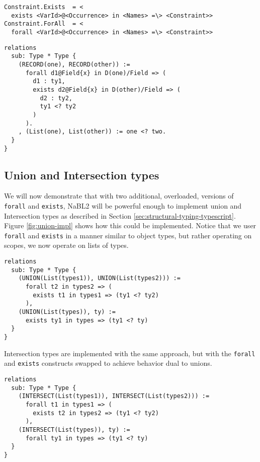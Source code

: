\begin{figure*}
\begin{lstlisting}
Constraint.Exists  = <
  exists <VarId>@<Occurrence> in <Names> =\> <Constraint>>
Constraint.ForAll  = <
  forall <VarId>@<Occurrence> in <Names> =\> <Constraint>>
\end{lstlisting}
\caption{New constraint syntax constructs for NaBL2.}
\label{fig:nabl-syntax-proposal-constraint}
\end{figure*}

\begin{figure*}
\begin{lstlisting}
relations
  sub: Type * Type {
    (RECORD(one), RECORD(other)) :=
      forall d1@Field{x} in D(one)/Field => (
        d1 : ty1,
        exists d2@Field{x} in D(other)/Field => (
          d2 : ty2,
          ty1 <? ty2
        )
      ).
    , (List(one), List(other)) := one <? two.
  }
}
\end{lstlisting}
\caption{Example usage of the new syntax constructs for structural types.}
\label{fig:nabl-syntax-proposal-usage}
\end{figure*}

\subsection{Union and Intersection types}
We will now demonstrate that with two additional, overloaded, versions of \texttt{forall} and \texttt{exists},
NaBL2 will be powerful enough to implement union and Intersection types as described in Section \ref{sec:structural-typing-typescript}.
Figure \ref{fig:union-impl} shows how this could be implemented.
Notice that we user \texttt{forall} and \texttt{exists} in a manner similar to object types, 
but rather operating on scopes, we now operate on lists of types.

\begin{figure*}
\begin{lstlisting}
relations
  sub: Type * Type {
    (UNION(List(types1)), UNION(List(types2))) :=
      forall t2 in types2 => (
        exists t1 in types1 => (ty1 <? ty2)
      ),
    (UNION(List(types)), ty) :=
      exists ty1 in types => (ty1 <? ty)
  }
}
\end{lstlisting}
\caption{Implementation of union types by using a custom subtype relation and overloaded \texttt{forall} and \texttt{exists} constraints.}
\label{fig:union-impl}
\end{figure*}

Intersection types are implemented with the same approach, but with the \texttt{forall} and \texttt{exists} constructs swapped to achieve behavior dual to unions.

\begin{figure*}
\begin{lstlisting}
relations
  sub: Type * Type {
    (INTERSECT(List(types1)), INTERSECT(List(types2))) :=
      forall t1 in types1 => (
        exists t2 in types2 => (ty1 <? ty2)
      ),
    (INTERSECT(List(types)), ty) :=
      forall ty1 in types => (ty1 <? ty)
  }
}
\end{lstlisting}
\caption{Intersection types, using the same constructs as union types.}
\label{fig:intersect-impl}
\end{figure*}